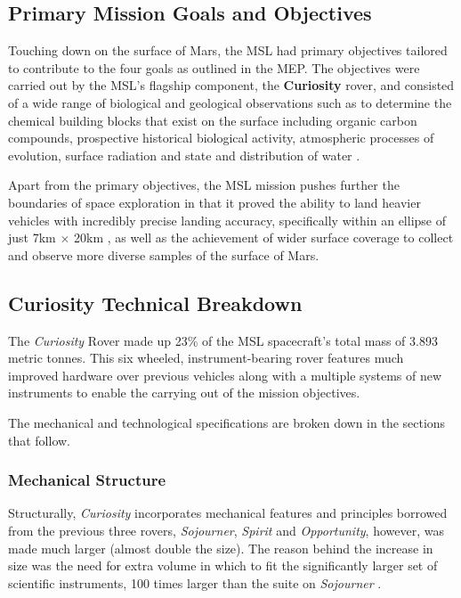     \subsection{Primary Mission Goals and Objectives}
      Touching down on the surface of Mars, the MSL had primary objectives tailored to contribute to the four goals as outlined in the MEP. The objectives were carried out by the MSL's flagship component, the \textbf{Curiosity} rover, and consisted of a wide range of biological and geological observations such as to determine the chemical building blocks that exist on the surface including organic carbon compounds, prospective historical biological activity, atmospheric processes of evolution, surface radiation and state and distribution of water \cite{mslobjectivesjpl}.
      
      Apart from the primary objectives, the MSL mission pushes further the boundaries of space exploration in that it proved the ability to land heavier vehicles with incredibly precise landing accuracy, specifically within an ellipse of just 7km $\times$ 20km \cite{gwebster_2012}, as well as the achievement of wider surface coverage to collect and observe more diverse samples of the surface of Mars.
              
    \subsection{Curiosity Technical Breakdown}
      The \textit{Curiosity} Rover made up 23\% of the MSL spacecraft's total mass of 3.893 metric tonnes. This six wheeled, instrument-bearing rover features much improved hardware over previous vehicles along with a multiple systems of new instruments to enable the carrying out of the mission objectives.
      
      The mechanical and technological specifications are broken down in the sections that follow.
      
      \subsubsection{Mechanical Structure}
        Structurally, \textit{Curiosity} incorporates mechanical features and principles borrowed from the previous three rovers, \textit{Sojourner}, \textit{Spirit} and \textit{Opportunity}, however, was made much larger (almost double the size). The reason behind the increase in size was the need for extra volume in which to fit the significantly larger set of scientific instruments, 100 times larger than the suite on \textit{Sojourner} \cite{planetary2011}.
        
